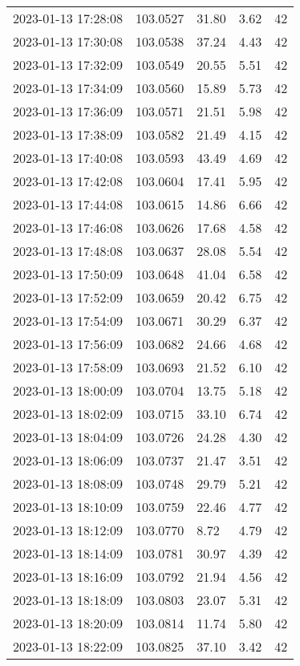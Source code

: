 \documentclass{nature_plusfigure}
\begin{document}
\begin{supplement}
\begin{center}
\begin{longtable}{lllll}
2023-01-13 17:28:08 & 103.0527 & 31.80 & 3.62 & 42 \\ 
2023-01-13 17:30:08 & 103.0538 & 37.24 & 4.43 & 42 \\ 
2023-01-13 17:32:09 & 103.0549 & 20.55 & 5.51 & 42 \\ 
2023-01-13 17:34:09 & 103.0560 & 15.89 & 5.73 & 42 \\ 
2023-01-13 17:36:09 & 103.0571 & 21.51 & 5.98 & 42 \\ 
2023-01-13 17:38:09 & 103.0582 & 21.49 & 4.15 & 42 \\ 
2023-01-13 17:40:08 & 103.0593 & 43.49 & 4.69 & 42 \\ 
2023-01-13 17:42:08 & 103.0604 & 17.41 & 5.95 & 42 \\ 
2023-01-13 17:44:08 & 103.0615 & 14.86 & 6.66 & 42 \\ 
2023-01-13 17:46:08 & 103.0626 & 17.68 & 4.58 & 42 \\ 
2023-01-13 17:48:08 & 103.0637 & 28.08 & 5.54 & 42 \\ 
2023-01-13 17:50:09 & 103.0648 & 41.04 & 6.58 & 42 \\ 
2023-01-13 17:52:09 & 103.0659 & 20.42 & 6.75 & 42 \\ 
2023-01-13 17:54:09 & 103.0671 & 30.29 & 6.37 & 42 \\ 
2023-01-13 17:56:09 & 103.0682 & 24.66 & 4.68 & 42 \\ 
2023-01-13 17:58:09 & 103.0693 & 21.52 & 6.10 & 42 \\ 
2023-01-13 18:00:09 & 103.0704 & 13.75 & 5.18 & 42 \\ 
2023-01-13 18:02:09 & 103.0715 & 33.10 & 6.74 & 42 \\ 
2023-01-13 18:04:09 & 103.0726 & 24.28 & 4.30 & 42 \\ 
2023-01-13 18:06:09 & 103.0737 & 21.47 & 3.51 & 42 \\ 
2023-01-13 18:08:09 & 103.0748 & 29.79 & 5.21 & 42 \\ 
2023-01-13 18:10:09 & 103.0759 & 22.46 & 4.77 & 42 \\ 
2023-01-13 18:12:09 & 103.0770 & 8.72 & 4.79 & 42 \\ 
2023-01-13 18:14:09 & 103.0781 & 30.97 & 4.39 & 42 \\ 
2023-01-13 18:16:09 & 103.0792 & 21.94 & 4.56 & 42 \\ 
2023-01-13 18:18:09 & 103.0803 & 23.07 & 5.31 & 42 \\ 
2023-01-13 18:20:09 & 103.0814 & 11.74 & 5.80 & 42 \\ 
2023-01-13 18:22:09 & 103.0825 & 37.10 & 3.42 & 42 \\ 

\end{longtable}
\end{center}
\end{supplement}
\end{document}
